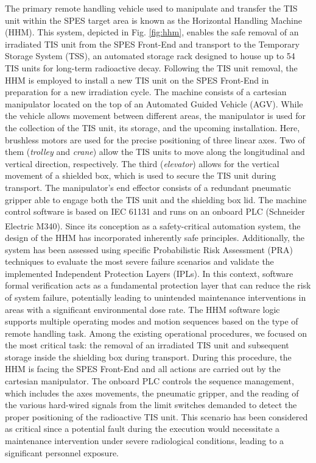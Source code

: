 \begin{bibunit}
The primary remote handling vehicle used to manipulate and transfer the TIS unit within the SPES target area is known as the Horizontal Handling Machine (HHM). This system, depicted in Fig. \ref{fig:hhm}, enables the safe removal of an irradiated TIS unit from the SPES Front-End and transport to the Temporary Storage System (TSS), an automated storage rack designed to house up to 54 TIS units for long-term radioactive decay. Following the TIS unit removal, the HHM is employed to install a new TIS unit on the SPES Front-End in preparation for a new irradiation cycle. The machine consists of a cartesian manipulator located on the top of an Automated Guided Vehicle (AGV). While the vehicle allows movement between different areas, the manipulator is used for the collection of the TIS unit, its storage, and the upcoming installation. Here, brushless motors are used for the precise positioning of three linear axes. 
Two of them (\textit{trolley} and \textit{crane}) allow the TIS units to move along the longitudinal and vertical direction, respectively. The third (\textit{elevator}) allows for the vertical movement of a shielded box, which is used to secure the TIS unit during transport. The manipulator's end effector consists of a redundant pneumatic gripper able to engage both the TIS unit and the shielding box lid. The machine control software is based on IEC 61131 and runs on an onboard PLC (Schneider Electric\textsuperscript{\textregistered} M340). Since its conception as a safety-critical automation system, the design of the HHM has incorporated inherently safe principles. Additionally, the system has been assessed using specific Probabilistic Risk Assessment (PRA) techniques to evaluate the most severe failure scenarios and validate the implemented Independent Protection Layers (IPLs). 
In this context, software formal verification acts as a fundamental protection layer that can reduce the risk of system failure, potentially leading to unintended maintenance interventions in areas with a significant environmental dose rate.
The HHM software logic supports multiple operating modes and motion sequences based on the type of remote handling task.
Among the existing operational procedures, we focused on the most critical task: the removal of an irradiated TIS unit and subsequent storage inside the shielding box during transport. 
During this procedure, the HHM is facing the SPES Front-End and all actions are carried out by the cartesian manipulator.
The onboard PLC controls the sequence management, which includes the axes movements, the pneumatic gripper, and the reading of the various hard-wired signals from the limit switches demanded to detect the proper positioning of the radioactive TIS unit. This scenario has been considered as critical since a potential fault during the execution would necessitate a maintenance intervention under severe radiological conditions, leading to a significant personnel exposure. 


\end{bibunit}
